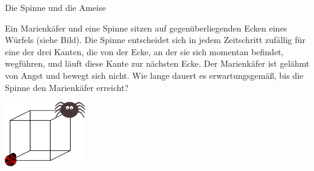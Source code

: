 \documentclass{uebungszettel}
\begin{document}
\begin{aufgabe}{Die Spinne und die Ameise}
  \begin{minipage}{12cm}
    Ein Marienkäfer und eine Spinne sitzen auf gegenüberliegenden Ecken eines Würfels (siehe Bild).
    Die Spinne entscheidet sich in jedem Zeitschritt zufällig für eine der drei Kanten, die von der Ecke, an der sie sich momentan befindet, wegführen, und läuft diese Kante zur nächsten Ecke.
    Der Marienkäfer ist gelähmt von Angst und bewegt sich nicht.
    Wie lange dauert es erwartungsgemäß, bis die Spinne den Marienkäfer erreicht?
  \end{minipage}
  \hfill
  \begin{minipage}{4cm}
    \includegraphics[width=3.5cm]{spider-and-ladybug}
  \end{minipage}

  \vspace{1.5cm}
  \begin{center}
  \end{center}
  \vspace{1cm}
\end{aufgabe}

\newpage
\end{document}
